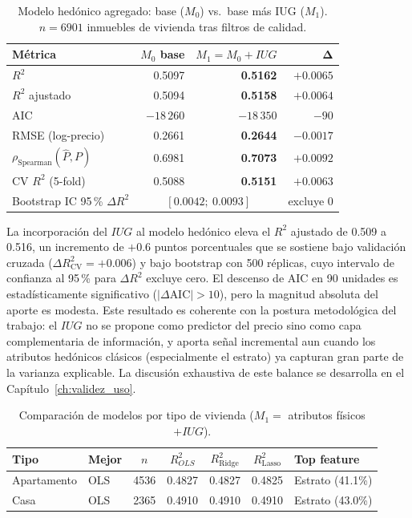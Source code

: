 \documentclass[12pt, a4paper, twoside, openright]{report}
\theoremstyle{plain}
\theoremstyle{definition}
\newcommand{\IUG}{IUG}             %
\begin{document}
\begin{table}[htbp]
\centering
\caption{Modelo hedónico agregado: base ($M_0$) vs.\ base más IUG ($M_1$). $n = \num{6901}$ inmuebles de vivienda tras filtros de calidad.}
\label{tab:modelo_agregado_res}
\small
\begin{tabular}{@{}lrrr@{}}
\toprule
\textbf{Métrica} & \textbf{$M_0$ base} & \textbf{$M_1 = M_0 + \IUG$} & $\boldsymbol{\Delta}$ \\
\midrule
$R^2$              & 0.5097 & \textbf{0.5162} & $+0.0065$ \\
$R^2$ ajustado     & 0.5094 & \textbf{0.5158} & $+0.0064$ \\
AIC                & $-18\,260$ & \textbf{$-18\,350$} & $-90$ \\
RMSE (log-precio)  & 0.2661 & \textbf{0.2644} & $-0.0017$ \\
$\rho_\text{Spearman}(\hat{P}, P)$ & 0.6981 & \textbf{0.7073} & $+0.0092$ \\
CV $R^2$ (5-fold)  & 0.5088 & \textbf{0.5151} & $+0.0063$ \\
Bootstrap IC 95\,\% $\Delta R^2$ & \multicolumn{2}{c}{$[0.0042;\ 0.0093]$} & excluye 0 \\
\bottomrule
\end{tabular}
\end{table}

La incorporación del $\IUG{}$ al modelo hedónico eleva el $R^2$ ajustado de 0.509 a 0.516, un incremento de $+0.6$ puntos porcentuales que se sostiene bajo validación cruzada ($\Delta R^2_{\text{CV}} = +0.006$) y bajo bootstrap con \num{500} réplicas, cuyo intervalo de confianza al 95\,\% para $\Delta R^2$ excluye cero. El descenso de AIC en 90 unidades es estadísticamente significativo ($|\Delta\text{AIC}| > 10$), pero la magnitud absoluta del aporte es modesta. Este resultado es coherente con la postura metodológica del trabajo: el $\IUG{}$ no se propone como predictor del precio sino como capa complementaria de información, y aporta señal incremental aun cuando los atributos hedónicos clásicos (especialmente el estrato) ya capturan gran parte de la varianza explicable. La discusión exhaustiva de este balance se desarrolla en el Capítulo~\ref{ch:validez_uso}.

\begin{table}[htbp]
\centering
\caption{Comparación de modelos por tipo de vivienda ($M_1 = $ atributos físicos $+ \IUG$).}
\label{tab:modelos_res}
\begin{tabular}{@{}llccccl@{}}
\toprule
\textbf{Tipo} & \textbf{Mejor} & $n$ & $R^2_{OLS}$ & $R^2_{\text{Ridge}}$ &
$R^2_{\text{Lasso}}$ & \textbf{Top feature} \\
\midrule
Apartamento & OLS   & \num{4536} & 0.4827 & 0.4827 & 0.4825 & Estrato (41.1\%) \\
Casa        & OLS   & \num{2365} & 0.4910 & 0.4910 & 0.4910 & Estrato (43.0\%) \\
\bottomrule
\end{tabular}
\end{table}
\end{document}
